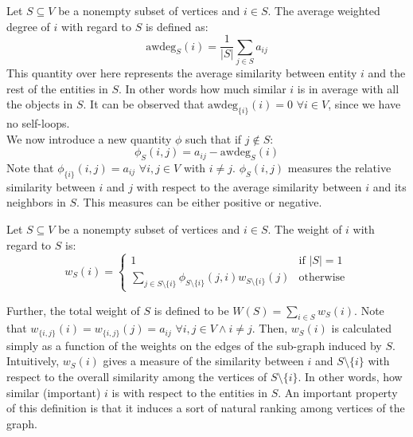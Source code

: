 Let $S\subseteq V$ be a nonempty subset of vertices and $i \in S$. The average weighted degree of $i$ with regard to $S$ is defined as:\\
\begin{equation}
\text{awdeg}_S(i)=\frac{1}{|S|}\sum_{j\in S}a_{ij}
\end{equation}
This quantity over here represents the average similarity between entity $i$ and the rest of the entities in $S$. In other words how much similar $i$ is in average with all the objects in $S$.
It can be observed that $\text{awdeg}_{\{i\}}(i) = 0$  $\forall i \in V$, since we have no self-loops.\\
We now introduce a new quantity $\phi$ such that if $j \notin S$:
\begin{equation}
\phi_S(i, j)=a_{ij}-\text{awdeg}_S(i)
\end{equation}
Note that $\phi_{\{i\}}(i, j)=a_{ij}$ $\forall i, j\in V$ with $i \neq j$. $\phi_S(i, j)$ measures the relative similarity between $i$ and $j$ with respect to the average similarity between $i$ and its neighbors in $S$. This measures can be either positive or negative.

\begin{defn}{}
Let $S\subseteq V$ be a nonempty subset of vertices and $i \in S$. The weight of $i$ with regard to $S$ is:
\begin{equation}
w_S(i)= \begin{cases}
1 & \text{if } |S| = 1 \\
\sum\limits_{j\in S\setminus \{i\}}\phi_{S\setminus \{i\}}(j, i)w_{S\setminus \{i\}}(j) & \text{otherwise}
\end{cases}
\end{equation}
\end{defn}

Further, the total weight of $S$ is defined to be $W(S)=\sum_{i\in S}w_S(i)$.
Note that $w_{\{i, j\}}(i)=w_{\{i, j\}}(j)=a_{ij}$ $\forall i, j \in V \land i\neq j$. Then, $w_S(i)$ is calculated simply as a function of the weights on the edges of the sub-graph induced by $S$.\\

Intuitively, $w_S(i)$ gives a measure of the similarity between $i$ and $S\setminus \{i\}$ with respect to the overall similarity among the vertices of $S\setminus \{i\}$. In other words, how similar (important) $i$ is with respect to the entities in $S$.
An important property of this definition is that it induces a sort of natural ranking among vertices of the graph. 


